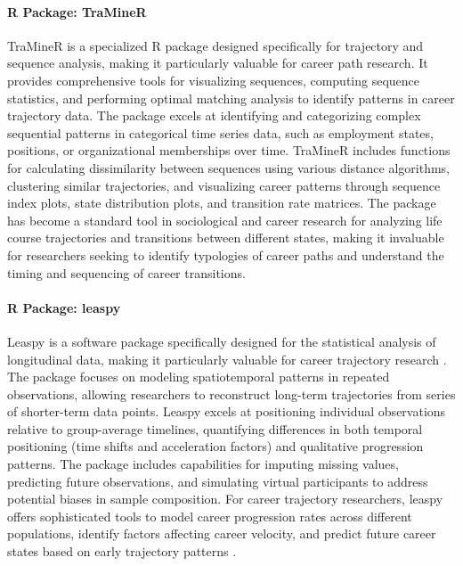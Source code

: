 \documentclass[../main.tex]{subfiles}
\begin{document}
\paragraph{R Package: TraMineR}
TraMineR is a specialized R package designed specifically for trajectory and sequence analysis, making it particularly valuable for career path research. It provides comprehensive tools for visualizing sequences, computing sequence statistics, and performing optimal matching analysis to identify patterns in career trajectory data. The package excels at identifying and categorizing complex sequential patterns in categorical time series data, such as employment states, positions, or organizational memberships over time. TraMineR includes functions for calculating dissimilarity between sequences using various distance algorithms, clustering similar trajectories, and visualizing career patterns through sequence index plots, state distribution plots, and transition rate matrices. The package has become a standard tool in sociological and career research for analyzing life course trajectories and transitions between different states, making it invaluable for researchers seeking to identify typologies of career paths and understand the timing and sequencing of career transitions.

\paragraph{R Package: leaspy}
Leaspy is a software package specifically designed for the statistical analysis of longitudinal data, making it particularly valuable for career trajectory research \citep{leaspy2024}. The package focuses on modeling spatiotemporal patterns in repeated observations, allowing researchers to reconstruct long-term trajectories from series of shorter-term data points. Leaspy excels at positioning individual observations relative to group-average timelines, quantifying differences in both temporal positioning (time shifts and acceleration factors) and qualitative progression patterns. The package includes capabilities for imputing missing values, predicting future observations, and simulating virtual participants to address potential biases in sample composition. For career trajectory researchers, leaspy offers sophisticated tools to model career progression rates across different populations, identify factors affecting career velocity, and predict future career states based on early trajectory patterns \citep{leaspy2024}.
\end{document}
